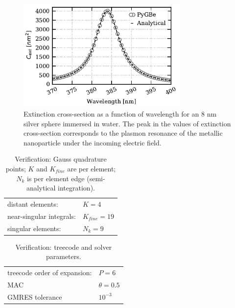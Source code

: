 \begin{figure}[h] %
    \centering
    \includegraphics[width=0.75\textwidth]{silver_NP_verification.pdf} 
    \caption{Extinction cross-section as a function of wavelength for an $8$ nm
             silver sphere immersed in water. The peak in the values of 
             extinction cross-section corresponds to the plasmon resonance of the metallic 
             nanoparticle under the incoming electric field.}
    \label{fig:verif_sph}
 \end{figure}

\begin{table}[h]
    \centering
    \caption{\label{table:quadparams2} Verification: Gauss quadrature points; 
    $K$ and $K_{fine}$ are per element; $N_k $ is per element edge (semi-analytical integration). } 
    \begin{tabular}{l l}
    \hline%
     distant elements: & $K=4$ \\
     near-singular integrals:   & $ K_{fine}=19$ \\
     singular elements:  & $N_k =9$ \\
    \hline%
    \end{tabular}
\end{table}

\begin{table}[h]
    \centering
    \caption{\label{table:treeparams2} Verification: treecode and solver parameters.} 
    \begin{tabular}{l l}
    \hline%
    treecode order of expansion: & $P=6$\\
    MAC                                         & $\theta=0.5$\\
    GMRES tolerance                    & $10^{-3}$\\
    \hline%
    \end{tabular}
\end{table}

